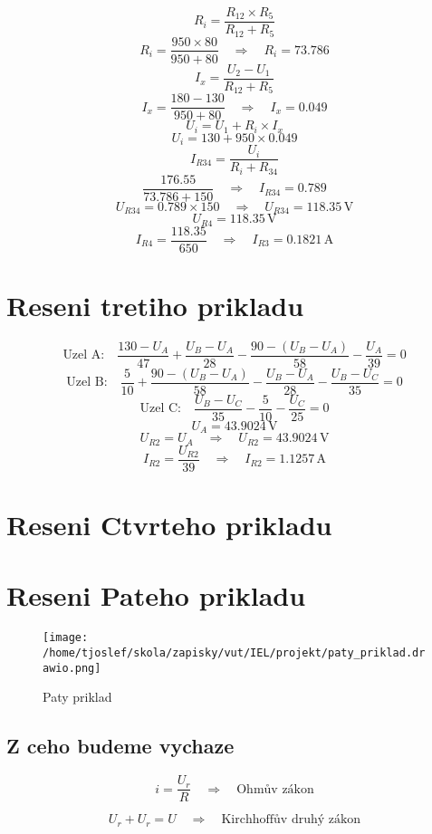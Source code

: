 \documentclass{article}
\begin{document}
\[
    R_i = \frac{R_{12} \times R_5}{R_{12} + R_5}
\]
\[
    R_i = \frac{950 \times 80}{950 + 80} \quad \Rightarrow \quad R_i = 73.786
\]
\[
    I_x = \frac{U_2 - U_1}{R_{12} + R_5}
\]
\[
    I_x = \frac{180 - 130}{950 + 80} \quad \Rightarrow \quad I_x = 0.049
\]
\[
    U_i = U_1 + R_i \times I_x
\]
\[
    U_i = 130 + 950 \times 0.049
\]
\[
    I_{R34} = \frac{U_i}{R_i + R_{34}}
\]
\[
    \frac{176.55}{73.786 + 150} \quad \Rightarrow \quad I_{R34} = 0.789
\]
\[
    U_{R34} = 0.789 \times 150 \quad \Rightarrow \quad U_{R34} = 118.35 \, \text{V}
\]
\[
    U_{R4} = 118.35 \, \text{V}
\]
\[
    I_{R4} = \frac{118.35}{650} \quad \Rightarrow \quad I_{R3} = 0.1821 \, \text{A}
\]

\section{Reseni tretiho prikladu}
\[
    \text{Uzel A:} \quad \frac{130 - U_A}{47} + \frac{U_B -U_A}{28} - \frac{90 - (U_B - U_A)}{58} - \frac{U_A}{39} = 0
\]
\[
    \text{Uzel B:} \quad \frac{5}{10} + \frac{90 - (U_B - U_A)}{58} - \frac{U_B - U_A}{28} - \frac{U_B -U_C}{35} = 0
\]
\[
    \text{Uzel C:} \quad \frac{U_B - U_C}{35} - \frac{5}{10} - \frac{U_C}{25} = 0
\]
\[
    U_A = 43.9024 \, \text{V}
\]
\[
    U_{R2} = U_A  \quad \Rightarrow \quad U_{R2} = 43.9024 \, \text{V}
\]
\[
    I_{R2} = \frac{U_{R2}}{39} \quad \Rightarrow \quad I_{R2} = 1.1257 \, \text{A}
\]
\section{Reseni Ctvrteho prikladu}

\section{Reseni Pateho prikladu}
\begin{figure}[!ht]
  \centering
  \texttt{[image: /home/tjoslef/skola/zapisky/vut/IEL/projekt/paty\_priklad.drawio.png]}
  \caption{Paty priklad}
  \label{fig:priklad5}
\end{figure}
\subsection*{Z ceho budeme vychaze}
\[
i = \frac{U_r}{R} \quad \Rightarrow \quad \text{Ohmův zákon}
\]

\[
U_r + U_r = U \quad \Rightarrow \quad \text{Kirchhoffův druhý zákon}
\]
\end{document}
